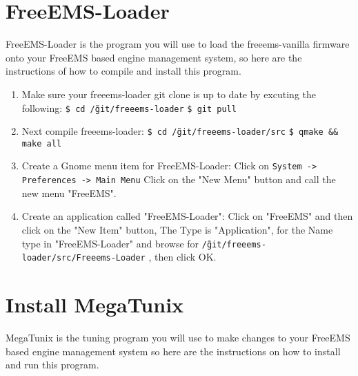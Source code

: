\documentclass[12pt,notitlepage,onecolumn,oneside,openany,draft]{memoir}
\begin{document}
\chapter{\textsf{FreeEMS-Loader}}

\textsf{FreeEMS-Loader is the program you will use to load the freeems-vanilla firmware onto your FreeEMS based engine management system, so here are the instructions of how to compile and install this program.} \newline

\begin{enumerate}
\item \textsf{Make sure your freeems-loader git clone is up to date by excuting the following:} \newline
      \texttt{\$ cd \~/git/freeems-loader} \newline
      \texttt{\$ git pull}

\item \textsf{Next compile freeems-loader:} \newline
      \texttt{\$ cd \~/git/freeems-loader/src} \newline
      \texttt{\$ qmake \&\& make all}

\item \textsf{Create a Gnome menu item for FreeEMS-Loader:} \newline
      \textsf{Click on } \texttt{System -> Preferences -> Main Menu} \newline
      \textsf{Click on the "New Menu" button and call the new menu "FreeEMS".}

\item \textsf{Create an application called "FreeEMS-Loader":} \newline
      \textsf{Click on "FreeEMS" and then click on the "New Item" button,} \newline
      \textsf{The Type is "Application", for the Name type in "FreeEMS-Loader" and browse for} \newline
      \texttt{\~/git/freeems-loader/src/Freeems-Loader} \textsf{, then click OK.}
\end{enumerate}

\chapter{\textsf{Install MegaTunix}}

\textsf{MegaTunix is the tuning program you will use to make changes to your FreeEMS based engine management system so here are the instructions on how to install and run this program.} \newline
\end{document}
